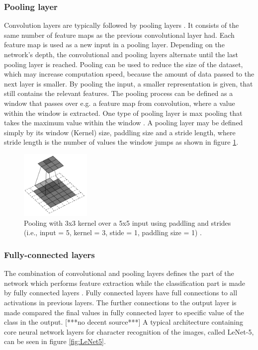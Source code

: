 \subsubsection{Pooling layer}  
Convolution layers are typically followed by pooling layers \citep{LeCun2015, Goodfellow2016}. It consists of the same number of feature maps as the previous convolutional layer had. Each feature map is used as a new input in a pooling layer. Depending on the network's depth, the convolutional and pooling layers alternate until the last pooling layer is reached.\citep{LeCun1998}
Pooling can be used to reduce the size of the dataset, which may increase computation speed, because the amount of data passed to the next layer is smaller. By pooling the input, a smaller representation is given, that still contains the relevant features.\citep{Goodfellow2016,LeCun1998}   
\noindent  
The pooling process can be defined as a window that passes over e.g. a feature map from convolution, where a value within the window is extracted. One type of pooling layer is max pooling that takes the maximum value within the window \citep{Goodfellow2016,Dumoulin2016}. A pooling layer may be defined simply by its window (Kernel) size, paddling size and a stride length, where stride length is the number of values the window jumps as shown in figure \ref{fig:Kernel}.\citep{Dumoulin2016}

\begin{figure} [H]
\centering
\includegraphics[width=0.30\textwidth]{figures/Kernel}
\caption{Pooling with 3x3 kernel over a 5x5 input using paddling and strides (i.e., input = 5, kernel = 3, stide = 1, paddling size = 1) \citep{Dumoulin2016}.}
\label{fig:Kernel}  
\end{figure}

\subsubsection{Fully-connected layers}
The combination of convolutional and pooling layers defines the part of the network which performs feature extraction while the classification part is made by fully connected layers \citep{Goodfellow2016}. Fully connected layers have full connections to all activations in previous layers. The further connections to the output layer is made compared the final values in fully connected layer to specific value of the class in the output. [***no decent source***]
A typical architecture containing core neural network layers for character recognition of the images, called LeNet-5, can be seen in figure \ref{fig:LeNet5}.

